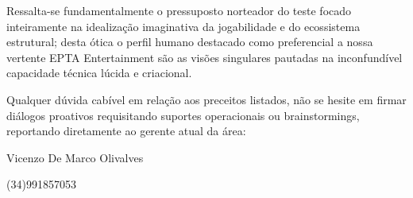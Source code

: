 \documentclass[a4paper, 12pt,  oneside,a4paper,english,french,spanish,brazil]{book}     %
\begin{document}
Ressalta-se fundamentalmente o pressuposto norteador do teste focado inteiramente na idealização imaginativa da jogabilidade e do ecossistema estrutural; desta ótica o perfil humano destacado como preferencial a nossa vertente EPTA Entertainment são as visões singulares pautadas na inconfundível capacidade técnica lúcida e criacional.

Qualquer dúvida cabível em relação aos preceitos listados, não se hesite em firmar diálogos proativos requisitando suportes operacionais ou brainstormings, reportando diretamente ao gerente atual da área:

Vicenzo De Marco Olivalves

(34)991857053
\end{document}
